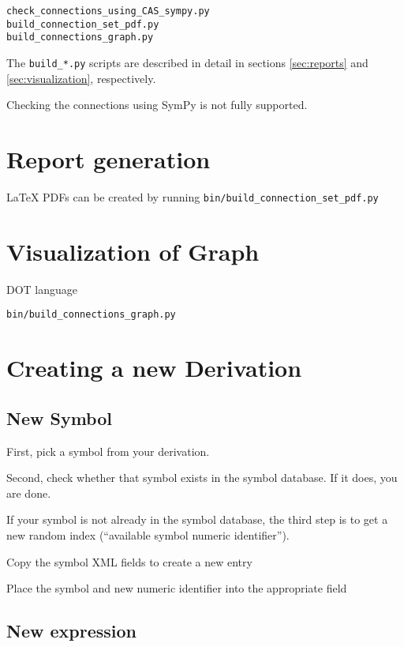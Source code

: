 \documentclass{article}
\begin{document}
\begin{multicols}{2}
\begin{verbatim}
check_connections_using_CAS_sympy.py
build_connection_set_pdf.py
build_connections_graph.py
\end{verbatim}

The \texttt{build\_*.py} scripts are described in detail in sections \ref{sec:reports} and \ref{sec:visualization}, respectively. 

Checking the connections using SymPy is not fully supported. 

\section{Report generation\label{sec:reports}}

\LaTeX\cite{1994_Latex} PDFs can be created by running \texttt{bin/build\_connection\_set\_pdf.py}

\section{Visualization of Graph\label{sec:visualization}}

DOT language\cite{2015_Graphviz} 

\texttt{bin/build\_connections\_graph.py}

\section{Creating a new Derivation\label{sec:new_derivation}}

\subsection{New Symbol\label{sec:new_symbol}}

First, pick a symbol from your derivation.

Second, check whether that symbol exists in the symbol database. If it does, you are done.

If your symbol is not already in the symbol database, the third step is to get a new  random index (``available symbol numeric identifier''). 

Copy the symbol XML fields to create a new entry

Place the symbol and new numeric identifier into the appropriate field

\subsection{New expression\label{sec:new_expression}}


\end{multicols}
\end{document}
